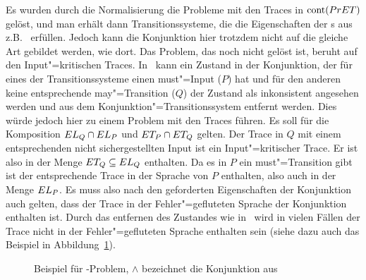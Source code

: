 Es wurden durch die Normalisierung die Probleme mit den Traces in $\mathrm{cont}
(PrET)$ gelöst, und man erhält dann Transitionssysteme, die die Eigenschaften
der \MIA{}s aus z.B.~\cite{Vogler2016MIA3} erfüllen. Jedoch kann die
Konjunktion hier trotzdem nicht auf die gleiche Art gebildet werden, wie dort.
Das Problem, das noch nicht gelöst ist, beruht auf den Input"=kritischen
Traces. In~\cite{Vogler2016MIA3} kann ein Zustand in der Konjunktion, der für
eines der Transitionssysteme einen must"=Input ($P$) hat und für den anderen
keine entsprechende may"=Transition ($Q$) der Zustand als inkonsistent
angesehen werden und aus dem Konjunktion"=Transitionssystem entfernt werden.
Dies würde jedoch hier zu einem Problem mit den Traces führen. Es soll für die
Komposition $EL _Q \cap EL _P$ und $ET _P \cap ET _Q$ gelten. Der Trace in
$Q$ mit einem entsprechenden nicht sichergestellten Input ist ein
Input"=kritischer Trace. Er ist also in der Menge $ET _Q\subseteq EL _Q$
enthalten. Da es in $P$ ein must"=Transition gibt ist der entsprechende Trace
in der Sprache von $P$ enthalten, also auch in der Menge $EL _P$. Es muss also
nach den geforderten Eigenschaften der Konjunktion auch gelten, dass der Trace
in der Fehler"=gefluteten Sprache der Konjunktion enthalten ist. Durch das
entfernen des Zustandes wie in~\cite{Vogler2016MIA3} wird in vielen Fällen der
Trace nicht in der Fehler"=gefluteten Sprache enthalten sein (siehe dazu auch
das Beispiel in Abbildung~\ref{BspMITConj}).

\begin{figure}[htbp]
  \begin{center}
    \caption{Beispiel für \MIT{}-Problem, $\land$ bezeichnet die Konjunktion
    aus~\cite{Vogler2016MIA3}}
    \label{BspMITConj}
  \end{center}
\end{figure}


